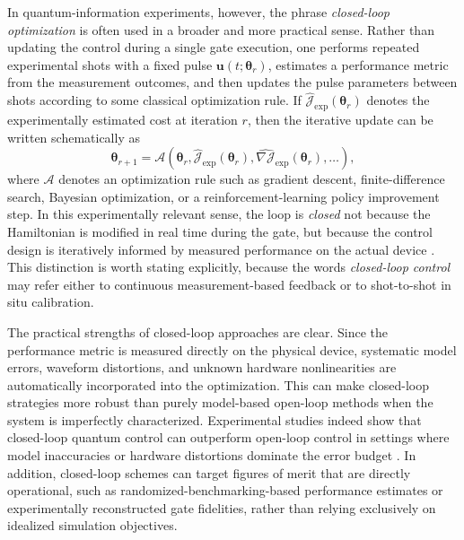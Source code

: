 In quantum-information experiments, however, the phrase \emph{closed-loop optimization} is often used in a broader and more practical sense. Rather than updating the control during a single gate execution, one performs repeated experimental shots with a fixed pulse $\bm{u}(t;\bm{\theta}_r)$, estimates a performance metric from the measurement outcomes, and then updates the pulse parameters between shots according to some classical optimization rule. If $\widehat{\mathcal{J}}_{\mathrm{exp}}(\bm{\theta}_r)$ denotes the experimentally estimated cost at iteration $r$, then the iterative update can be written schematically as
\begin{equation}
\bm{\theta}_{r+1}
=
\mathcal{A}
\!\left(
\bm{\theta}_{r},
\widehat{\mathcal{J}}_{\mathrm{exp}}(\bm{\theta}_{r}),
\widehat{\nabla \mathcal{J}}_{\mathrm{exp}}(\bm{\theta}_{r}),
\dots
\right),
\label{eq:iterative_closed_loop_update}
\end{equation}
where $\mathcal{A}$ denotes an optimization rule such as gradient descent, finite-difference search, Bayesian optimization, or a reinforcement-learning policy improvement step. In this experimentally relevant sense, the loop is \emph{closed} not because the Hamiltonian is modified in real time during the gate, but because the control design is iteratively informed by measured performance on the actual device \cite{Ferrie2015,Feng2018}. This distinction is worth stating explicitly, because the words \emph{closed-loop control} may refer either to continuous measurement-based feedback or to shot-to-shot in situ calibration.

The practical strengths of closed-loop approaches are clear. Since the performance metric is measured directly on the physical device, systematic model errors, waveform distortions, and unknown hardware nonlinearities are automatically incorporated into the optimization. This can make closed-loop strategies more robust than purely model-based open-loop methods when the system is imperfectly characterized. Experimental studies indeed show that closed-loop quantum control can outperform open-loop control in settings where model inaccuracies or hardware distortions dominate the error budget \cite{Ferrie2015,Feng2018}. In addition, closed-loop schemes can target figures of merit that are directly operational, such as randomized-benchmarking-based performance estimates or experimentally reconstructed gate fidelities, rather than relying exclusively on idealized simulation objectives.

